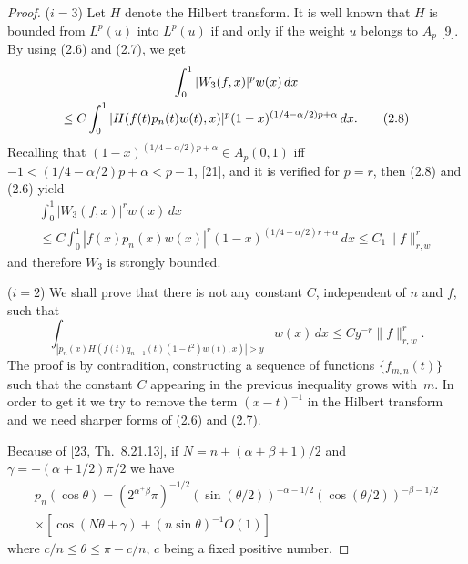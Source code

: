 \documentclass[10pt,a4paper]{article}
\theoremstyle{plain}
\theoremstyle{remark}
\begin{document}
\begin{proof}
($i = 3$) Let $H$ denote the Hilbert transform. It is well
known that $H$ is bounded from $L^{p}(u)$ into $L^{p}(u)$ if and only
if the weight $u$ belongs to $A_{p}$ [9]. By using (2.6) and (2.7),
we get
\begin{multline}
\int_{0}^{1} |W_{3}(f,x)|^{p}w(x)\,dx \notag \\
\leq C \int_{0}^{1} |H(f(t)p_{n}(t)w(t),x)|^{p} (1-x)^{(1/4-\alpha/2)p+\alpha}\,dx.
\tag{2.8}
\end{multline}
Recalling that $(1-x)^{(1/4-\alpha/2)p+\alpha} \in A_{p}(0,1)$
iff $-1 < (1/4-\alpha/2)p+\alpha < p-1$, [21], and it is verified
for $p = r$, then (2.8) and (2.6) yield
\begin{multline*}
\int_{0}^{1} |W_{3}(f,x)|^{r}w(x)\,dx \\
\leq C \int_{0}^{1} |f(x)p_{n}(x)w(x)|^{r} (1-x)^{(1/4-\alpha/2)r+\alpha}\,dx
\leq C_{1} \|f\|_{r,w}^{r}
\end{multline*}
and therefore $W_{3}$ is strongly bounded.

($i = 2$) We shall prove that there is not any constant $C$,
independent of $n$ and $f$, such that
\begin{equation}
\int_{|p_{n}(x)H(f(t)q_{n-1}(t)(1-t^{2})w(t),x)| > y} w(x)\,dx
\leq Cy^{-r} \|f\|^{r}_{r,w}.
\tag{2.9}
\end{equation}
The proof is by contradition, constructing a sequence of functions
$\{f_{m,n}(t)\}$ such that the constant $C$ appearing in the previous
inequality grows with~$m$. In order to get it we try to remove
the term $(x-t)^{-1}$ in the Hilbert transform and we need sharper forms
of (2.6) and (2.7).

Because of [23, Th.~8.21.13], if $N = n+(\alpha+\beta+1)/2$
and $\gamma = -(\alpha+1/2)\pi/2$ we have
\begin{multline*}
p_{n}(\cos\theta) = (2^{\alpha^+\beta}\pi)^{-1/2}
(\sin(\theta/2))^{-\alpha-1/2} (\cos(\theta/2))^{-\beta-1/2} \\
\times [\cos(N\theta+\gamma)+(n\sin\theta)^{-1}O(1)]
\end{multline*}
where $c/n \leq \theta \leq \pi-c/n$,
$c$ being a fixed positive number.


\end{proof}
\end{document}
